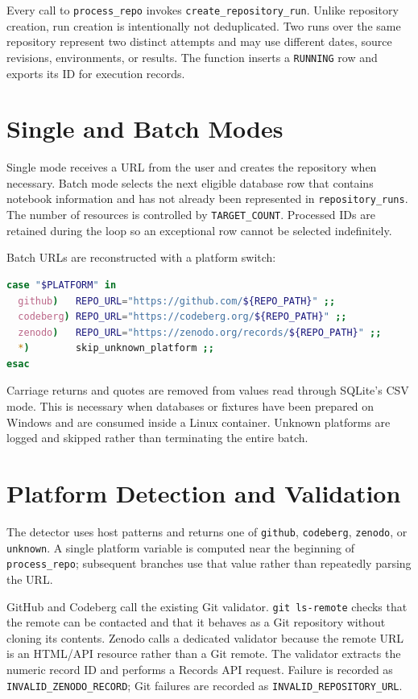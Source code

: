 Every call to \texttt{process\_repo} invokes \texttt{create\_repository\_run}. Unlike repository creation, run creation is intentionally not deduplicated. Two runs over the same repository represent two distinct attempts and may use different dates, source revisions, environments, or results. The function inserts a \texttt{RUNNING} row and exports its ID for execution records.

\section{Single and Batch Modes}

Single mode receives a URL from the user and creates the repository when necessary. Batch mode selects the next eligible database row that contains notebook information and has not already been represented in \texttt{repository\_runs}. The number of resources is controlled by \texttt{TARGET\_COUNT}. Processed IDs are retained during the loop so an exceptional row cannot be selected indefinitely.

Batch URLs are reconstructed with a platform switch:

\begin{lstlisting}[language=bash,caption={Simplified mixed-platform URL reconstruction.}]
case "$PLATFORM" in
  github)   REPO_URL="https://github.com/${REPO_PATH}" ;;
  codeberg) REPO_URL="https://codeberg.org/${REPO_PATH}" ;;
  zenodo)   REPO_URL="https://zenodo.org/records/${REPO_PATH}" ;;
  *)        skip_unknown_platform ;;
esac
\end{lstlisting}

Carriage returns and quotes are removed from values read through SQLite's CSV mode. This is necessary when databases or fixtures have been prepared on Windows and are consumed inside a Linux container. Unknown platforms are logged and skipped rather than terminating the entire batch.

\section{Platform Detection and Validation}

The detector uses host patterns and returns one of \texttt{github}, \texttt{codeberg}, \texttt{zenodo}, or \texttt{unknown}. A single platform variable is computed near the beginning of \texttt{process\_repo}; subsequent branches use that value rather than repeatedly parsing the URL.

GitHub and Codeberg call the existing Git validator. \texttt{git ls-remote} checks that the remote can be contacted and that it behaves as a Git repository without cloning its contents. Zenodo calls a dedicated validator because the remote URL is an HTML/API resource rather than a Git remote. The validator extracts the numeric record ID and performs a Records API request. Failure is recorded as \texttt{INVALID\_ZENODO\_RECORD}; Git failures are recorded as \texttt{INVALID\_REPOSITORY\_URL}.

